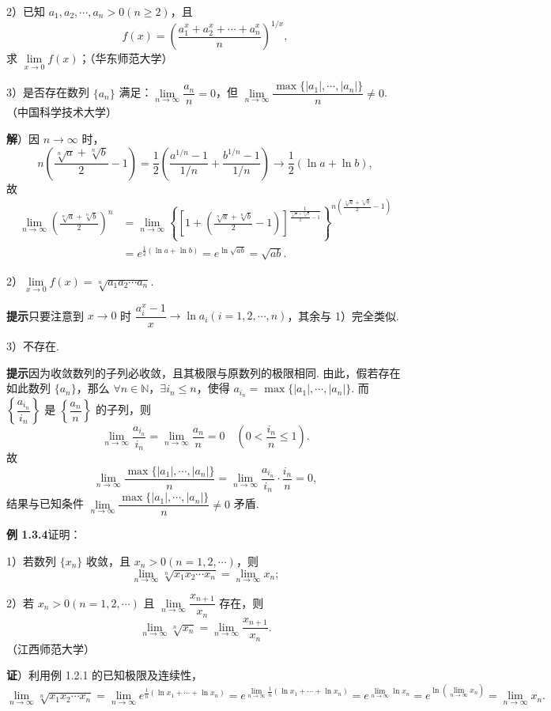 \documentclass[UTF8, 12pt, fontset=fandol, oneside]{ctexart}
\begin{document}
2）已知 $a_1,a_2,\cdots,a_n>0(n\ge2)$，且
\[
  f(x)=\left(\frac{a_1^x+a_2^x+\cdots+a_n^x}{n}\right)^{1/x},
\]
求 $\lim\limits_{x\to0}f(x)$；（华东师范大学）

3）是否存在数列 $\{a_n\}$ 满足：$\lim\limits_{n\to\infty}\dfrac{a_n}{n}=0$，但 $\lim\limits_{n\to\infty}\dfrac{\max\{|a_1|,\cdots,|a_n|\}}n\ne0$.（中国科学技术大学）

\noindent\textbf{解}）因 $n\to\infty$ 时，
\[
n\left(\frac{\sqrt[n]{a}+\sqrt[n]{b}}2-1\right)
=\frac12\left(\frac{a^{1/n}-1}{1/n}+\frac{b^{1/n}-1}{1/n}\right)
\to\frac12(\ln a+\ln b),
\]
故
\[
\begin{aligned}
\lim_{n\to\infty}\left(\frac{\sqrt[n]{a}+\sqrt[n]{b}}2\right)^n
&=\lim_{n\to\infty}
\left\{\left[1+\left(\frac{\sqrt[n]{a}+\sqrt[n]{b}}2-1\right)\right]^{
\frac1{\frac{\sqrt[n]{a}+\sqrt[n]{b}}2-1}}\right\}^{
n\left(\frac{\sqrt[n]{a}+\sqrt[n]{b}}2-1\right)}\\
&=e^{\frac12(\ln a+\ln b)}=e^{\ln\sqrt{ab}}=\sqrt{ab}.
\end{aligned}
\]

2）$\lim\limits_{x\to0}f(x)=\sqrt[n]{a_1a_2\cdots a_n}$.

\noindent\textbf{提示}\quad 只要注意到 $x\to0$ 时 $\dfrac{a_i^x-1}{x}\to\ln a_i(i=1,2,\cdots,n)$，其余与 1）完全类似.

3）不存在.

\noindent\textbf{提示}\quad 因为收敛数列的子列必收敛，且其极限与原数列的极限相同. 由此，假若存在如此数列 $\{a_n\}$，那么 $\forall n\in\mathbb{N}$，$\exists i_n\le n$，使得 $a_{i_n}=\max\{|a_1|,\cdots,|a_n|\}$. 而 $\left\{\dfrac{a_{i_n}}{i_n}\right\}$ 是 $\left\{\dfrac{a_n}{n}\right\}$ 的子列，则
\[
  \lim_{n\to\infty}\frac{a_{i_n}}{i_n}=\lim_{n\to\infty}\frac{a_n}{n}=0\quad\left(0<\frac{i_n}{n}\le1\right).
\]
故
\[
  \lim_{n\to\infty}\frac{\max\{|a_1|,\cdots,|a_n|\}}n
  =\lim_{n\to\infty}\frac{a_{i_n}}{i_n}\cdot\frac{i_n}{n}=0,
\]
结果与已知条件 $\lim\limits_{n\to\infty}\dfrac{\max\{|a_1|,\cdots,|a_n|\}}n\ne0$ 矛盾.

\noindent\textbf{例 1.3.4}\quad 证明：

1）若数列 $\{x_n\}$ 收敛，且 $x_n>0(n=1,2,\cdots)$，则
\[
  \lim_{n\to\infty}\sqrt[n]{x_1x_2\cdots x_n}
  =\lim_{n\to\infty}x_n;
\]

2）若 $x_n>0(n=1,2,\cdots)$ 且 $\lim\limits_{n\to\infty}\dfrac{x_{n+1}}{x_n}$ 存在，则
\[
  \lim_{n\to\infty}\sqrt[n]{x_n}
  =\lim_{n\to\infty}\frac{x_{n+1}}{x_n}.
\]
（江西师范大学）

\noindent\textbf{证}）利用例 1.2.1 的已知极限及连续性，
\[
\lim_{n\to\infty}\sqrt[n]{x_1x_2\cdots x_n}
=\lim_{n\to\infty}e^{\frac1n(\ln x_1+\cdots+\ln x_n)}
=e^{\lim\limits_{n\to\infty}\frac1n(\ln x_1+\cdots+\ln x_n)}
=e^{\lim\limits_{n\to\infty}\ln x_n}
=e^{\ln(\lim\limits_{n\to\infty}x_n)}
=\lim_{n\to\infty}x_n.
\]
\end{document}
